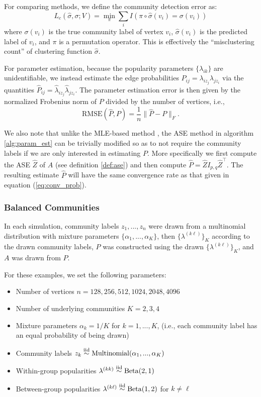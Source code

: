 \documentclass[
  12pt,
]{article}
\providecommand{\tightlist}{%
  \setlength{\itemsep}{0pt}\setlength{\parskip}{0pt}}
\theoremstyle{definition}
\theoremstyle{definition}
\theoremstyle{definition}
\theoremstyle{definition}
\theoremstyle{remark}
\begin{document}
For comparing methods, we define the community detection error as:
\[L_c(\hat{\sigma}, \sigma; V) = \min_\pi \sum_i I(\pi \circ \hat{\sigma}(v_i) = \sigma(v_i))\]
where \(\sigma(v_i)\) is the true community label of vertex \(v_i\), \(\hat{\sigma}(v_i)\) is the predicted label of \(v_i\), and \(\pi\) is a permutation operator.
This is effectively the ``misclustering count'' of clustering function \(\hat{\sigma}\).

For parameter estimation, because the popularity parameters \(\{\lambda_{ik}\}\) are unidentifiable, we instead estimate the edge probabilities \(P_{ij} = \lambda_{i z_j} \lambda_{j z_i}\) via the quantities \(\hat{P}_{ij} = \hat{\lambda}_{iz_j} \hat{\lambda}_{jz_i}\).
The parameter estimation error is then given by the normalized Frobenius norm of \(P\) divided by the number of vertices, i.e.,
\[\mathrm{RMSE}(\hat{P}, P) = \frac{1}{n} \|\hat{P} - P\|_F.\]

We also note that unlike the MLE-based method \citep{307cbeb9b1be48299388437423d94bf1}, the ASE method in algorithm \ref{alg:param_est} can be trivially modified so as to not require the community labels if we are only interested in estimating \(P\).
More specifically we first compute the ASE \(\hat{Z}\) of \(A\) (see definition \ref{def:ase}) and then compute \(\hat{P} = \hat{Z} I_{p,q} \hat{Z}^{\top}\).
The resulting estimate \(\hat{P}\) will have the same convergence rate as that given in equation (\ref{eq:conv_prob}).

\hypertarget{sec:balanced-communities}{%
\subsubsection{Balanced Communities}\label{sec:balanced-communities}}

In each simulation, community labels \(z_1, ..., z_n\) were drawn from a
multinomial distribution with mixture parameters
\(\{\alpha_1, ..., \alpha_K\}\), then \(\{\lambda^{(k \ell)}\}_K\) according
to the drawn community labels, \(P\) was constructed using the drawn
\(\{\lambda^{(k \ell)}\}_K\), and \(A\) was drawn from \(P\).

For these examples, we set the following parameters:

\begin{itemize}
\tightlist
\item
Number of vertices \(n = 128, 256, 512, 1024, 2048, 4096\)
\item
Number of underlying communities \(K = 2, 3, 4\)
\item
Mixture parameters \(\alpha_k = 1 / K\) for \(k = 1, ..., K\), (i.e.,
each community label has an equal probability of being drawn)
\item
Community labels
\(z_k \stackrel{\text{iid}}{\sim} \mathrm{Multinomial}(\alpha_1, ..., \alpha_K)\)
\item
Within-group popularities
\(\lambda^{(kk)} \stackrel{\text{iid}}{\sim} \mathrm{Beta}(2, 1)\)
\item
Between-group popularities
\(\lambda^{(k \ell)} \stackrel{\text{iid}}{\sim} \mathrm{Beta}(1, 2)\) for
\(k \neq \ell\)
\end{itemize}
\end{document}
